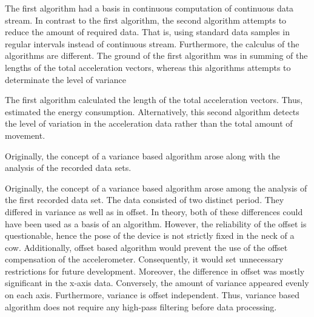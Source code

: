 \documentclass[english,12pt,a4paper,pdftex,elec,utf8]{aaltothesis}
\begin{document}
The first algorithm had a basis in continuous computation of continuous data stream. In contrast to the first algorithm, the second algorithm attempts to reduce the amount of required data. That is, using standard data samples in regular intervals instead of continuous stream. Furthermore, the calculus of the algorithms are different. The ground of the first algorithm was in summing of the lengths of the total acceleration vectors, whereas this algorithms attempts to determinate the level of variance 


The first algorithm calculated the length of the total acceleration vectors. Thus, estimated the energy consumption. Alternatively, this second algorithm detects the level of variation in the acceleration data rather than the total amount of movement. 

Originally, the concept of a variance based algorithm arose along with the analysis of the recorded data sets.  


Originally, the concept of a variance based algorithm arose among the analysis of the first recorded data set. The data consisted of two distinct period. They differed in variance as well as in offset. In theory, both of these differences could have been used as a basis of an algorithm. However, the reliability of the offset is questionable, hence the pose of the device is not strictly fixed in the neck of a cow. Additionally, offset based algorithm would prevent the use of the offset compensation of the accelerometer. Consequently, it would set unnecessary restrictions for future development. Moreover, the difference in offset was mostly significant in the x-axis data. Conversely, the amount of variance appeared evenly on each axis. Furthermore, variance is offset independent. Thus, variance based algorithm does not require any high-pass filtering before data processing.
\end{document}

